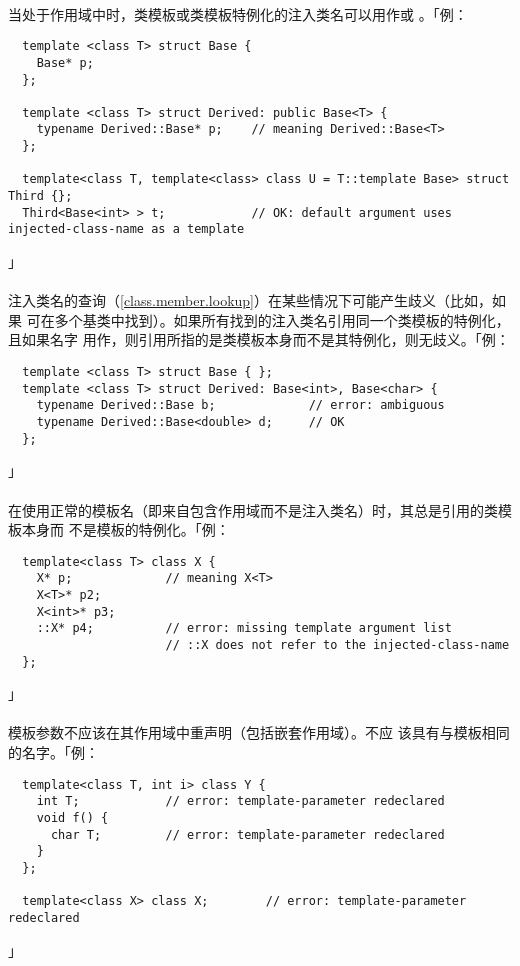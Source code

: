 \paragraph{}
当处于作用域中时，类模板或类模板特例化的注入类名可以用作或
。「例：
\begin{lstlisting}
  template <class T> struct Base {
    Base* p;
  };

  template <class T> struct Derived: public Base<T> {
    typename Derived::Base* p;    // meaning Derived::Base<T>
  };

  template<class T, template<class> class U = T::template Base> struct Third {};
  Third<Base<int> > t;            // OK: default argument uses injected-class-name as a template
\end{lstlisting}」

\paragraph{}
注入类名的查询（\ref{class.member.lookup}）在某些情况下可能产生歧义（比如，如果
可在多个基类中找到）。如果所有找到的注入类名引用同一个类模板的特例化，且如果名字
用作，则引用所指的是类模板本身而不是其特例化，则无歧义。「例：
\begin{lstlisting}
  template <class T> struct Base { };
  template <class T> struct Derived: Base<int>, Base<char> {
    typename Derived::Base b;             // error: ambiguous
    typename Derived::Base<double> d;     // OK
  };
\end{lstlisting}」

\paragraph{}
在使用正常的模板名（即来自包含作用域而不是注入类名）时，其总是引用的类模板本身而
不是模板的特例化。「例：
\begin{lstlisting}
  template<class T> class X {
    X* p;             // meaning X<T>
    X<T>* p2;
    X<int>* p3;
    ::X* p4;          // error: missing template argument list
                      // ::X does not refer to the injected-class-name
  };
\end{lstlisting}」

\paragraph{}
模板参数不应该在其作用域中重声明（包括嵌套作用域）。不应
该具有与模板相同的名字。「例：
\begin{lstlisting}
  template<class T, int i> class Y {
    int T;            // error: template-parameter redeclared
    void f() {
      char T;         // error: template-parameter redeclared
    }
  };

  template<class X> class X;        // error: template-parameter redeclared
\end{lstlisting}」


